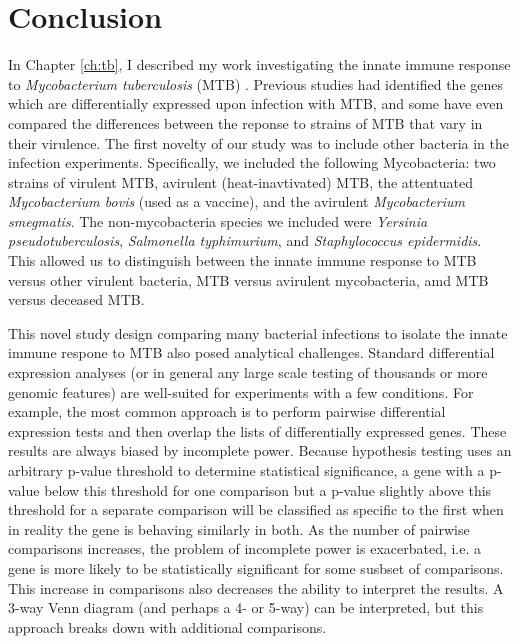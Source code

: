 \chapter{Conclusion}\label{conclusion}

In Chapter \ref{ch:tb}, I described my work investigating the innate
immune response to \emph{Mycobacterium tuberculosis} (MTB)
\citep{Blischak2015}. Previous studies had identified the genes which
are differentially expressed upon infection with MTB, and some have
even compared the differences between the reponse to strains of MTB
that vary in their virulence. The first novelty of our study was to
include other bacteria in the infection experiments. Specifically, we
included the following Mycobacteria: two strains of virulent MTB,
avirulent (heat-inavtivated) MTB, the attentuated \emph{Mycobacterium
  bovis} (used as a vaccine), and the avirulent \emph{Mycobacterium
  smegmatis}. The non-mycobacteria species we included were
\emph{Yersinia pseudotuberculosis}, \emph{Salmonella typhimurium}, and
\emph{Staphylococcus epidermidis}. This allowed us to distinguish
between the innate immune response to MTB versus other virulent
bacteria, MTB versus avirulent mycobacteria, amd MTB versus deceased
MTB.

This novel study design comparing many bacterial infections to isolate
the innate immune respone to MTB also posed analytical
challenges. Standard differential expression analyses (or in general
any large scale testing of thousands or more genomic features) are
well-suited for experiments with a few conditions. For example, the
most common approach is to perform pairwise differential expression
tests and then overlap the lists of differentially expressed
genes. These results are always biased by incomplete power. Because
hypothesis testing uses an arbitrary p-value threshold to determine
statistical significance, a gene with a p-value below this threshold
for one comparison but a p-value slightly above this threshold for a
separate comparison will be classified as specific to the first when
in reality the gene is behaving similarly in both. As the number of
pairwise comparisons increases, the problem of incomplete power is
exacerbated, i.e. a gene is more likely to be statistically
significant for some susbset of comparisons. This increase in
comparisons also decreases the ability to interpret the results. A
3-way Venn diagram (and perhaps a 4- or 5-way) can be interpreted, but
this approach breaks down with additional comparisons.

